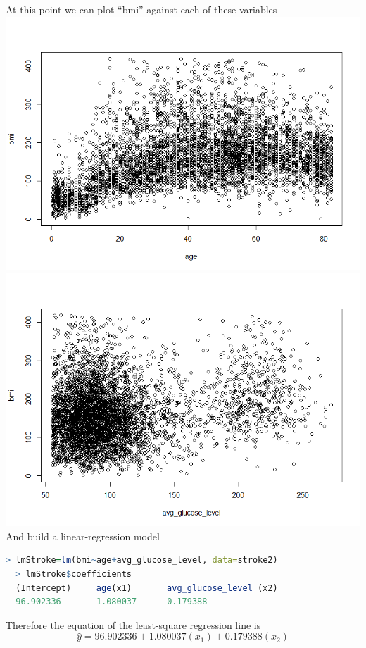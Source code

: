 \documentclass[boxes, qed]{homework}
\begin{document}
At this point we can plot ``bmi''
against each of these variables\\
\includegraphics[scale=.5]{bmi-age}\\
\includegraphics[scale=.5]{bmi-avg_glucose_level}\\

And build a linear-regression model
\begin{lstlisting}[backgroundcolor = \color{lightgray},language = R]
  > lmStroke=lm(bmi~age+avg_glucose_level, data=stroke2)
  > lmStroke$coefficients
  (Intercept)     age(x1)       avg_glucose_level (x2)
  96.902336       1.080037      0.179388 
\end{lstlisting}
Therefore the equation of the least-square regression line is
$$ \hat{y} = 96.902336 + 1.080037(x_1) + 0.179388(x_2) $$
\end{document}
